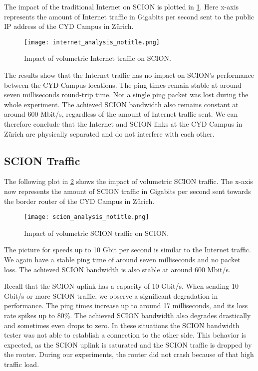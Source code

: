 The impact of the traditional Internet on SCION is plotted in \cref{fig:internet_traffic}.
Here x-axis represents the amount of Internet traffic in Gigabits per second sent to the public IP address of the CYD Campus in Zürich.

\begin{figure}[H]
    \centering
    \texttt{[image: internet\_analysis\_notitle.png]}
    \caption{Impact of volumetric Internet traffic on SCION.}
    \label{fig:internet_traffic}
\end{figure}

The results show that the Internet traffic has no impact on SCION's performance between the CYD Campus locations.
The ping times remain stable at around seven milliseconds round-trip time.
Not a single ping packet was lost during the whole experiment.
The achieved SCION bandwidth also remains constant at around 600 Mbit/s, regardless of the amount of Internet traffic sent.
We can therefore conclude that the Internet and SCION links at the CYD Campus in Zürich are physically separated and do not interfere with each other.


\subsection{SCION Traffic}

The following plot in \cref{fig:scion_traffic} shows the impact of volumetric SCION traffic.
The x-axis now represents the amount of SCION traffic in Gigabits per second sent towards the border router of the CYD Campus in Zürich.

\begin{figure}[H]
    \centering
    \texttt{[image: scion\_analysis\_notitle.png]}
    \caption{Impact of volumetric SCION traffic on SCION.}
    \label{fig:scion_traffic}
\end{figure}

The picture for speeds up to 10 Gbit per second is similar to the Internet traffic.
We again have a stable ping time of around seven milliseconds and no packet loss.
The achieved SCION bandwidth is also stable at around 600 Mbit/s.

Recall that the SCION uplink has a capacity of 10 Gbit/s.
When sending 10 Gbit/s or more SCION traffic, we observe a significant degradation in performance.
The ping times increase up to around 17 milliseconds, and its loss rate spikes up to 80\%.
The achieved SCION bandwidth also degrades drastically and sometimes even drops to zero.
In these situations the SCION bandwidth tester was not able to establish a connection to the other side.
This behavior is expected, as the SCION uplink is saturated and the SCION traffic is dropped by the router.
During our experiments, the router did not crash because of that high traffic load.

